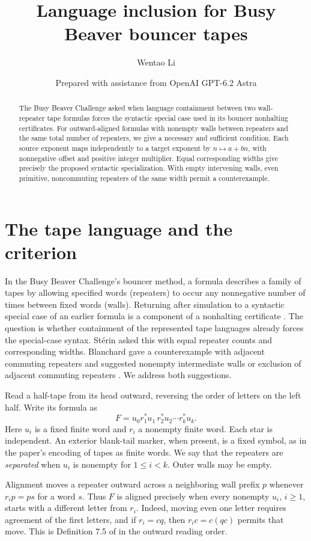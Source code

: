 \documentclass[11pt]{article}
\title{Language inclusion for Busy Beaver bouncer tapes}
\author{Wentao Li}
\date{Prepared with assistance from OpenAI GPT-6.2 Astra}
\begin{document}
\maketitle
\begin{abstract}
The Busy Beaver Challenge asked when language containment between two wall-repeater tape formulas forces the syntactic special case used in its bouncer nonhalting certificates. For outward-aligned formulas with nonempty walls between repeaters and the same total number of repeaters, we give a necessary and sufficient condition. Each source exponent maps independently to a target exponent by $n\mapsto a+bn$, with nonnegative offset and positive integer multiplier. Equal corresponding widths give precisely the proposed syntactic specialization. With empty intervening walls, even primitive, noncommuting repeaters of the same width permit a counterexample.
\end{abstract}

\section*{The tape language and the criterion}
In the Busy Beaver Challenge's bouncer method, a formula describes a family of tapes by allowing specified words (repeaters) to occur any nonnegative number of times between fixed words (walls). Returning after simulation to a syntactic special case of an earlier formula is a component of a nonhalting certificate \cite[Section 7.1]{paper}. The question is whether containment of the represented tape languages already forces the special-case syntax. St\'erin asked this with equal repeater counts and corresponding widths. Blanchard gave a counterexample with adjacent commuting repeaters and suggested nonempty intermediate walls or exclusion of adjacent commuting repeaters \cite{thread}. We address both suggestions.

Read a half-tape from its head outward, reversing the order of letters on the left half. Write its formula as
\[
  F=u_0 r_1^*u_1\, r_2^*u_2\cdots r_k^*u_k .
\]
Here $u_i$ is a fixed finite word and $r_i$ a nonempty finite word. Each star is independent. An exterior blank-tail marker, when present, is a fixed symbol, as in the paper's encoding of tapes as finite words. We say that the repeaters are \emph{separated} when $u_i$ is nonempty for $1\le i<k$. Outer walls may be empty.

Alignment moves a repeater outward across a neighboring wall prefix $p$ whenever $r_i p=p s$ for a word $s$. Thus $F$ is aligned precisely when every nonempty $u_i$, $i\ge1$, starts with a different letter from $r_i$. Indeed, moving even one letter requires agreement of the first letters, and if $r_i=cq$, then $r_ic=c(qc)$ permits that move. This is Definition 7.5 of \cite{paper} in the outward reading order.
\end{document}
